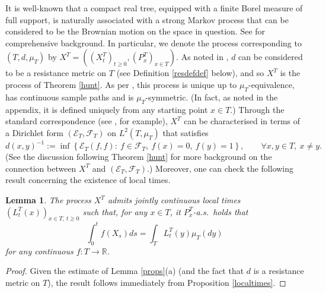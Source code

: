 \documentclass[a4paper, 11pt]{article}
\newtheorem{lem}[theorem]{Lemma}
\begin{document}
It is well-known that a compact real tree, equipped with a finite Borel measure of full support, is naturally associated with a strong Markov process that can be considered to be the Brownian motion on the space in question. See \cite{AEW,Kigden} for comprehensive background. In particular, we denote the process corresponding to $(T,d,\mu_T)$ by $X^T=((X^T_t)_{t\geq 0},(P^T_x)_{x\in T})$. As noted in \cite[Proposition 5.1]{Kigden}, $d$ can be considered to be a resistance metric on $T$ (see Definition \ref{resdefdef} below), and so $X^T$ is the process of Theorem \ref{hunt}. As per \cite[Theorem 1]{AEW}, this process is unique up to $\mu_T$-equivalence, has continuous sample paths and is $\mu_T$-symmetric. (In fact, as noted in the appendix, it is defined uniquely from any starting point $x\in T$.) Through the standard correspondence (see \cite[Theorem 7.2.1]{FOT}, for example), $X^T$ can be characterised in terms of a Dirichlet form $(\mathcal{E}_T,\mathcal{F}_T)$ on $L^2(T,\mu_T)$ that satisfies
\[d(x,y)^{-1}:=\inf\left\{\mathcal{E}_T(f,f):\:f\in\mathcal{F}_T,\:f(x)=0,\:f(y)=1\right\},\qquad \forall x,y\in T,\:x\neq y.\]
(See the discussion following Theorem \ref{hunt} for more background on the connection between $X^T$ and $(\mathcal{E}_T,\mathcal{F}_T)$.) Moreover, one can check the following result concerning the existence of local times.

\begin{lem}\label{ltlem}
The process $X^T$ admits jointly continuous local times $(L^T_t(x))_{x\in T,\:t\geq 0}$ such that, for any $x\in T$, it $P_x^T$-a.s.\ holds that
\begin{equation}\label{odf}
\int_0^tf(X_s)ds=\int_TL^T_t(y)\mu_T(dy)
\end{equation}
for any continuous $f:T\rightarrow\mathbb{R}$.
\end{lem}
\begin{proof}
Given the estimate of Lemma \ref{props}(a) (and the fact that $d$ is a resistance metric on $T$), the result follows immediately from Proposition \ref{localtimes}.
\end{proof}
\end{document}
